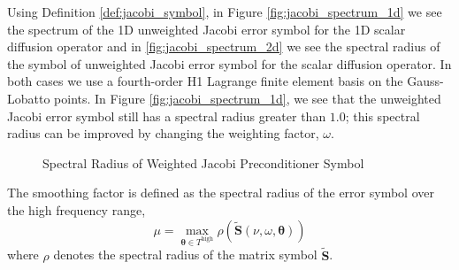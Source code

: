 Using Definition \ref{def:jacobi_symbol}, in Figure \ref{fig:jacobi_spectrum_1d} we see the spectrum of the 1D unweighted Jacobi error symbol for the 1D scalar diffusion operator and in \ref{fig:jacobi_spectrum_2d} we see the spectral radius of the symbol of unweighted Jacobi error symbol for the scalar diffusion operator.
In both cases we use a fourth-order H1 Lagrange finite element basis on the Gauss-Lobatto points.
In Figure \ref{fig:jacobi_spectrum_1d}, we see that the unweighted Jacobi error symbol still has a spectral radius greater than $1.0$; this spectral radius can be improved by changing the weighting factor, $\omega$.

\begin{figure}[!ht]
  \centering
  \hfill
  \caption{Spectral Radius of Weighted Jacobi Preconditioner Symbol}
\end{figure}

The smoothing factor is defined as the spectral radius of the error symbol over the high frequency range,
\begin{equation}
\mu = \max_{\boldsymbol{\theta} \in T^{\text{high}}} \rho \left( \tilde{\mathbf{S}} \left( \nu, \omega, \boldsymbol{\theta} \right) \right)
\end{equation}
where $\rho$ denotes the spectral radius of the matrix symbol $\tilde{\mathbf{S}}$.

